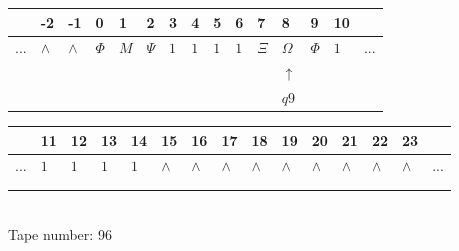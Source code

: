 \documentclass[11pt]{article}
\begin{document}
\begin{table}[H]
\centering
\begin{tabular}{lllllllllllllll}
 & -2 & -1 & 0 & 1 & 2 & 3 & 4 & 5 & 6 & 7 & 8 & 9 & 10 & \\
\hline
$...$ & \multicolumn{1}{|l|}{$\wedge$} & \multicolumn{1}{|l|}{$\wedge$} & \multicolumn{1}{|l|}{$\Phi$} & \multicolumn{1}{|l|}{$M$} & \multicolumn{1}{|l|}{$\Psi$} & \multicolumn{1}{|l|}{$1$} & \multicolumn{1}{|l|}{$1$} & \multicolumn{1}{|l|}{$1$} & \multicolumn{1}{|l|}{$1$} & \multicolumn{1}{|l|}{$\Xi$} & \multicolumn{1}{|l|}{$\Omega$} & \multicolumn{1}{|l|}{$\Phi$} & \multicolumn{1}{|l|}{$1$} & $...$\\
\hline
&  &  &  &  &  &  &  &  &  &  & $\uparrow$ &  &  &  \\
&  &  &  &  &  &  &  &  &  &  & $ q9 $ &  &  &  \\
\end{tabular}
\begin{tabular}{lllllllllllllll}
 & 11 & 12 & 13 & 14 & 15 & 16 & 17 & 18 & 19 & 20 & 21 & 22 & 23 & \\
\hline
$...$ & \multicolumn{1}{|l|}{$1$} & \multicolumn{1}{|l|}{$1$} & \multicolumn{1}{|l|}{$1$} & \multicolumn{1}{|l|}{$1$} & \multicolumn{1}{|l|}{$\wedge$} & \multicolumn{1}{|l|}{$\wedge$} & \multicolumn{1}{|l|}{$\wedge$} & \multicolumn{1}{|l|}{$\wedge$} & \multicolumn{1}{|l|}{$\wedge$} & \multicolumn{1}{|l|}{$\wedge$} & \multicolumn{1}{|l|}{$\wedge$} & \multicolumn{1}{|l|}{$\wedge$} & \multicolumn{1}{|l|}{$\wedge$} & $...$\\
\hline
&  &  &  &  &  &  &  &  &  &  &  &  &  &  \\
&  &  &  &  &  &  &  &  &  &  &  &  &  &  \\
\end{tabular}
\\
Tape number: 96
\noindent\makebox[\linewidth]{\hdashrule{\textwidth}{1pt}{1pt}}\end{table}
\end{document}
